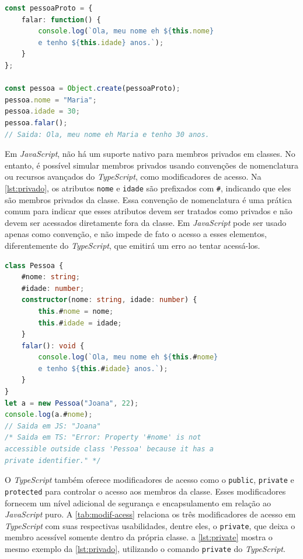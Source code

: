 \begin{lstlisting}[language=TypeScript, caption=Utilizando \texttt{Object.create} para criar objetos em JS., label=lst:objectcreate]
const pessoaProto = {
    falar: function() {
        console.log(`Ola, meu nome eh ${this.nome} 
        e tenho ${this.idade} anos.`);
    }
};

const pessoa = Object.create(pessoaProto);
pessoa.nome = "Maria";
pessoa.idade = 30;
pessoa.falar(); 
// Saida: Ola, meu nome eh Maria e tenho 30 anos.
\end{lstlisting}


Em \textit{JavaScript}, não há um suporte nativo para membros privados em classes. No entanto, é possível simular membros privados usando convenções de nomenclatura ou recursos avançados do \textit{TypeScript}, como modificadores de acesso. Na \autoref{lst:privado}, os atributos \texttt{nome} e \texttt{idade} são prefixados com \texttt{\#}, indicando que eles são membros privados da classe.  Essa convenção de nomenclatura é uma prática comum para indicar que esses atributos devem ser tratados como privados e não devem ser acessados diretamente fora da classe. Em \textit{JavaScript} pode ser usado apenas como convenção, e não impede de fato o acesso a esses elementos, diferentemente do \textit{TypeScript}, que emitirá um erro ao tentar acessá-los.



\begin{lstlisting}[language=TypeScript, caption=Simulação de membros privados usando convenção de nomenclatura em JS., label=lst:privado]
class Pessoa {
    #nome: string;
    #idade: number;
    constructor(nome: string, idade: number) {
        this.#nome = nome;
        this.#idade = idade;
    }
    falar(): void {
        console.log(`Ola, meu nome eh ${this.#nome}
        e tenho ${this.#idade} anos.`);
    }
}
let a = new Pessoa("Joana", 22);
console.log(a.#nome);
// Saida em JS: "Joana"
/* Saida em TS: "Error: Property '#nome' is not 
accessible outside class 'Pessoa' because it has a
private identifier." */
\end{lstlisting}

O \textit{TypeScript} também oferece modificadores de acesso como o \texttt{public}, \texttt{private} e \texttt{protected} para controlar o acesso aos membros da classe. Esses modificadores fornecem um nível adicional de segurança e encapsulamento em relação ao \textit{JavaScript} puro.  A \autoref{tab:modif-acess} relaciona os três modificadores de acesso em \textit{TypeScript} com suas respectivas usabilidades, dentre eles, o \texttt{private}, que deixa o membro acessível somente dentro da própria classe. a \autoref{lst:private} mostra o mesmo exemplo da \autoref{lst:privado}, utilizando o comando \texttt{private} do \textit{TypeScript}.


